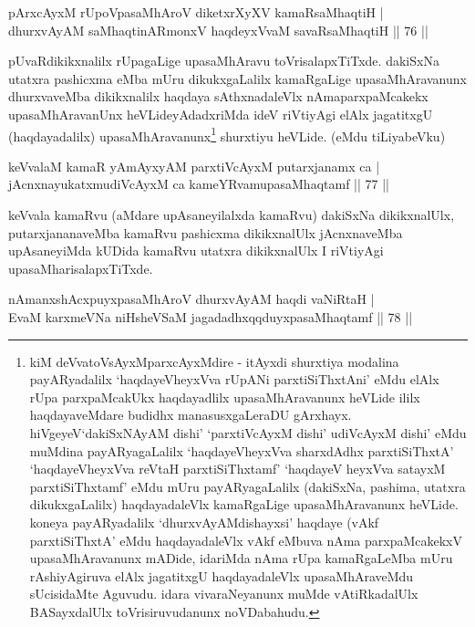 \begin{shl}
pArxcAyxM rUpoVpasaMhAroV diketxrXyXV kamaRsaMhaqtiH |\\
dhurxvAyAM saMhaqtinARmonxV haqdeyxVvaM savaRsaMhaqtiH \hfill || 76 ||
\end{shl}

\begin{artha}
pUvaRdikikxnalilx rUpagaLige upasaMhAravu toVrisalapxTiTxde. dakiSxNa utatxra pashicxma eMba mUru dikukxgaLalilx kamaRgaLige upasaMhAravanunx dhurxvaveMba dikikxnalilx haqdaya sAthxnadaleVlx nAmaparxpaMcakekx upasaMhAravanUnx heVLideyAdadxriMda ideV riVtiyAgi elAlx jagatitxgU (haqdayadalilx) upasaMhAravanunx\footnote[1]{kiM deVvatoV\s sAyxMparxcAyxMdire - itAyxdi shurxtiya modalina payARyadalilx `haqdayeVheyxVva rUpANi parxtiSiThxtAni' eMdu elAlx rUpa parxpaMcakUkx haqdayadlilx upasaMhAravanunx heVLide ililx haqdayaveMdare budidhx manasusxgaLeraDU gArxhayx. hiVgeyeV`dakiSxNAyAM dishi' `parxtiVcAyxM dishi' udiVcAyxM dishi' eMdu muMdina payARyagaLalilx `haqdayeVheyxVva sharxdAdhx parxtiSiThxtA' `haqdayeVheyxVva reVtaH parxtiSiThxtamf' `haqdayeV heyxVva satayxM parxtiSiThxtamf' eMdu mUru payARyagaLalilx (dakiSxNa, pashima, utatxra dikukxgaLalilx) haqdayadaleVlx kamaRgaLige upasaMhAravanunx heVLide. koneya payARyadalilx `dhurxvAyAMdishayxsi' haqdaye (vAkf parxtiSiThxtA' eMdu haqdayadaleVlx vAkf eMbuva nAma parxpaMcakekxV upasaMhAravanunx mADide, idariMda nAma rUpa kamaRgaLeMba mUru rAshiyAgiruva elAlx jagatitxgU haqdayadaleVlx upasaMhAraveMdu sUcisidaMte Aguvudu. idara vivaraNeyanunx muMde vAtiRkadalUlx BASayxdalUlx toVrisiruvudanunx noVDabahudu.} shurxtiyu heVLide. (eMdu tiLiyabeVku)
\end{artha}


\begin{shl}
keVvalaM kamaR yAmAyxyAM parxtiVcAyxM putarxjanamx ca |\\
jAcnxnayukatxmudiVcAyxM ca kameYRvamupasaMhaqtamf \hfill || 77 ||
\end{shl}

\begin{artha}
keVvala kamaRvu (aMdare upAsaneyilalxda kamaRvu) dakiSxNa dikikxnalUlx, putarxjananaveMba kamaRvu pashicxma dikikxnalUlx jAcnxnaveMba upAsaneyiMda kUDida kamaRvu utatxra dikikxnalUlx I riVtiyAgi upasaMharisalapxTiTxde.
\end{artha}

\begin{shl}
nAmanxshAcxpuyxpasaMhAroV \footnotemark[1]{}dhurxvAyAM haqdi vaNiRtaH |\\
EvaM karxmeVNa niHsheVSaM jagadadhxqqduyxpasaMhaqtamf \hfill || 78 ||
\end{shl}

